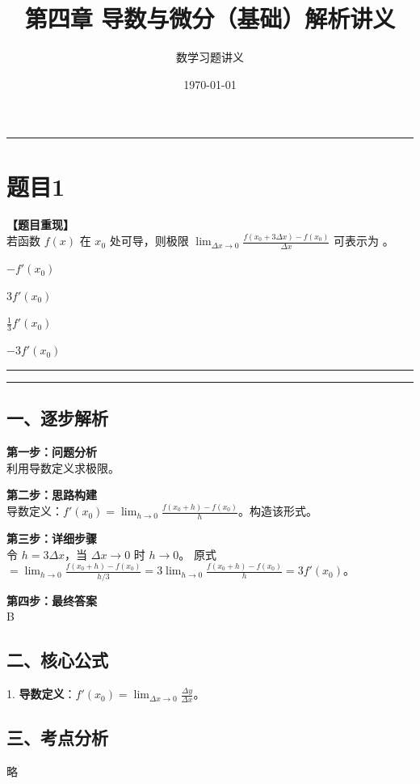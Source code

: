 \documentclass[12pt, a4paper]{ctexart}
\newcommand{\TopSeparator}{
    \par\noindent\rule{\textwidth}{1.5pt}\vspace{0.5em} %
}
\newcommand{\AnalysisSeparator}{
    \par\noindent\rule{\textwidth}{0.5pt}\vspace{0.2em}\hrule\vspace{0.5em} %
}
\newenvironment{RedAnalysis}{
    \par
    \color{red} %
}{
    \par
    \color{black} %
}
\newcommand{\choicesFour}[4]{
    \begin{enumerate}[label=\Alph*., itemsep=0pt, parsep=0pt, topsep=5pt, labelsep=0.5em]
        \begin{minipage}{0.22\linewidth} \item #1 \end{minipage}
        \begin{minipage}{0.22\linewidth} \item #2 \end{minipage}
        \begin{minipage}{0.22\linewidth} \item #3 \end{minipage}
        \begin{minipage}{0.22\linewidth} \item #4 \end{minipage}
    \end{enumerate}
}
\begin{document}
\title{\textbf{第四章 导数与微分（基础）解析讲义}}
\author{数学习题讲义}
\date{\today}
\maketitle

\TopSeparator
\section*{题目1}

\textbf{【题目重现】} \\
若函数 $ f(x) $ 在 $ x_{0} $ 处可导，则极限 $ \lim_{\Delta x \to 0} \frac{f(x_{0} + 3\Delta x) - f(x_{0})}{\Delta x} $ 可表示为 \underline{\hspace{1cm}}。
\choicesFour{$ -f'(x_{0}) $}{$ 3f'(x_{0}) $}{$ \frac{1}{3}f'(x_{0}) $}{$ -3f'(x_{0}) $}

\AnalysisSeparator

\begin{RedAnalysis}

\subsection*{一、逐步解析}

\textbf{第一步：问题分析} \\
利用导数定义求极限。

\textbf{第二步：思路构建} \\
导数定义：$f'(x_0) = \lim_{h\to 0} \frac{f(x_0+h)-f(x_0)}{h}$。构造该形式。

\textbf{第三步：详细步骤} \\
令 $h = 3\Delta x$，当 $\Delta x \to 0$ 时 $h \to 0$。
原式 $= \lim_{h\to 0} \frac{f(x_0+h)-f(x_0)}{h/3} = 3 \lim_{h\to 0} \frac{f(x_0+h)-f(x_0)}{h} = 3f'(x_0)$。

\textbf{第四步：最终答案} \\
B

\subsection*{二、核心公式}
1. \textbf{导数定义}：$f'(x_0) = \lim_{\Delta x\to 0} \frac{\Delta y}{\Delta x}$。

\subsection*{三、考点分析}
略

\end{RedAnalysis}
\end{document}
